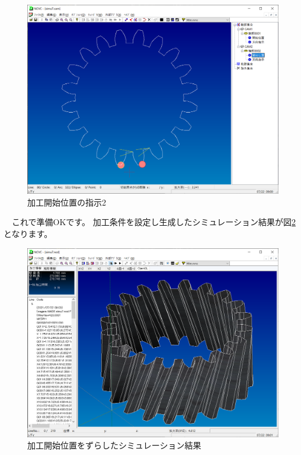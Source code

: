 \begin{figure}[H]
\centering
\includegraphics[scale=0.5]{No2/fig/start2.png}
\caption{加工開始位置の指示2}
\label{fig:start2.png}
\end{figure}

　これで準備OKです。
加工条件を設定し生成したシミュレーション結果が図\ref{fig:simu7.png} となります。

\begin{figure}[H]
\centering
\includegraphics[scale=0.5]{No2/fig/simu7.png}
\caption{加工開始位置をずらしたシミュレーション結果}
\label{fig:simu7.png}
\end{figure}

